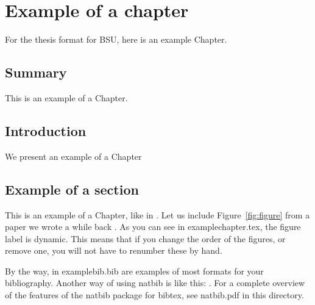 \chapter{Example of a chapter}
\label{chap:example}

For the thesis format for BSU, here is an example Chapter.

\section{Summary}
 
This is an example of a Chapter. 

\section{Introduction}

We present an example of a Chapter

\section{\nobreak Example of a section}

This is an example of a Chapter, like in \citet{Krauth2021}. Let us
include Figure~\ref{fig:figure} from a paper we wrote a while back
\citep{Wang2004a}. As you can see in examplechapter.tex, the
figure label is dynamic. This means that if you change the order of
the figures, or remove one, you will not have to renumber these by
hand.

By the way, in examplebib.bib are examples of most formats for your
bibliography. Another way of using natbib is like this: \cite[or][for
example]{mythesis}. For a complete overview of the features of the
natbib package for bibtex, see natbib.pdf in this directory.

